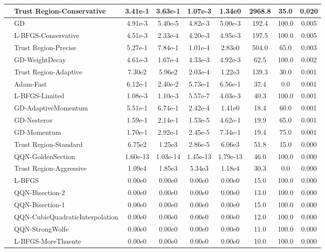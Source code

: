 \documentclass[10pt]{article}
\begin{document}
\begin{longtable}{|l|l|c|c|c|c|c|c|c|}
\hline
 & Trust Region-Conservative & 3.41e-1 & 3.63e-1 & 1.07e-3 & 1.34e0 & 2968.8 & 35.0 & 0.020 \\
\hline
 & GD & 4.91e-3 & 5.40e-5 & 4.82e-3 & 5.00e-3 & 192.4 & 100.0 & 0.005 \\
\hline
 & L-BFGS-Conservative & 4.51e-3 & 2.33e-4 & 4.20e-3 & 4.95e-3 & 197.5 & 100.0 & 0.005 \\
\hline
 & Trust Region-Precise & 5.27e-1 & 7.84e-1 & 1.01e-4 & 2.83e0 & 504.0 & 65.0 & 0.003 \\
\hline
 & GD-WeightDecay & 4.61e-3 & 1.67e-4 & 4.33e-3 & 4.92e-3 & 62.5 & 100.0 & 0.002 \\
\hline
 & Trust Region-Adaptive & 7.30e2 & 5.96e2 & 2.03e-4 & 1.22e3 & 139.3 & 30.0 & 0.001 \\
\hline
 & Adam-Fast & 6.12e-1 & 2.40e-2 & 5.73e-1 & 6.56e-1 & 37.4 & 0.0 & 0.001 \\
\hline
 & L-BFGS-Limited & 1.08e-3 & 1.10e-3 & 5.57e-7 & 4.03e-3 & 40.3 & 100.0 & 0.001 \\
\hline
 & GD-AdaptiveMomentum & 5.51e-1 & 6.74e-1 & 2.42e-4 & 1.41e0 & 18.4 & 60.0 & 0.001 \\
\hline
 & GD-Nesterov & 1.59e-1 & 2.14e-1 & 1.53e-5 & 4.62e-1 & 19.9 & 65.0 & 0.001 \\
\hline
 & GD-Momentum & 1.70e-1 & 2.92e-1 & 2.45e-5 & 7.34e-1 & 19.4 & 75.0 & 0.001 \\
\hline
 & Trust Region-Standard & 6.75e2 & 1.25e3 & 2.86e-5 & 6.06e3 & 51.8 & 15.0 & 0.000 \\
\hline
 & QQN-GoldenSection & 1.60e-13 & 1.03e-14 & 1.45e-13 & 1.79e-13 & 46.0 & 100.0 & 0.000 \\
\hline
 & Trust Region-Aggressive & 1.09e4 & 1.85e3 & 5.34e3 & 1.18e4 & 30.3 & 0.0 & 0.000 \\
\hline
 & L-BFGS & 0.00e0 & 0.00e0 & 0.00e0 & 0.00e0 & 15.0 & 100.0 & 0.000 \\
\hline
 & QQN-Bisection-2 & 0.00e0 & 0.00e0 & 0.00e0 & 0.00e0 & 13.0 & 100.0 & 0.000 \\
\hline
 & QQN-Bisection-1 & 0.00e0 & 0.00e0 & 0.00e0 & 0.00e0 & 15.0 & 100.0 & 0.000 \\
\hline
 & QQN-CubicQuadraticInterpolation & 0.00e0 & 0.00e0 & 0.00e0 & 0.00e0 & 12.0 & 100.0 & 0.000 \\
\hline
 & QQN-StrongWolfe & 0.00e0 & 0.00e0 & 0.00e0 & 0.00e0 & 11.0 & 100.0 & 0.000 \\
\hline
 & L-BFGS-MoreThuente & 0.00e0 & 0.00e0 & 0.00e0 & 0.00e0 & 10.0 & 100.0 & 0.000 \\

\end{longtable}
\end{document}
